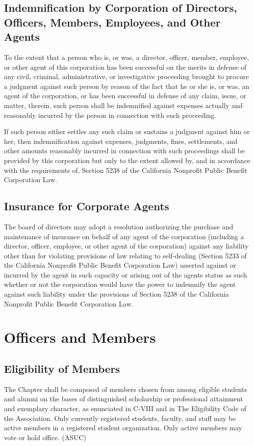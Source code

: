 \documentclass{article}
\begin{document}
	\subsection{Indemnification by Corporation of Directors, Officers, Members, Employees, and Other Agents}
	To the extent that a person who is, or was, a director, officer, member, employee, or other agent of this corporation has been successful on the merits in defense of any civil, criminal, administrative, or investigative proceeding brought to procure a judgment against such person by reason of the fact that he or she is, or was, an agent of the corporation, or has been successful in defense of any claim, issue, or matter, therein, such person shall be indemnified against expenses actually and reasonably incurred by the person in connection with such proceeding.
	
	If such person either settles any such claim or sustains a judgment against him or her, then indemnification against expenses, judgments, fines, settlements, and other amounts reasonably incurred in connection with such proceedings shall be provided by this corporation but only to the extent allowed by, and in accordance with the requirements of, Section 5238 of the California Nonprofit Public Benefit Corporation Law.
	
	\subsection{Insurance for Corporate Agents}
	The board of directors may adopt a resolution authorizing the purchase and maintenance of insurance on behalf of any agent of the corporation (including a director, officer, employee, or other agent of the corporation) against any liability other than for violating provisions of law relating to self-dealing (Section 5233 of the California Nonprofit Public Benefit Corporation Law) asserted against or incurred by the agent in such capacity or arising out of the agent\textquotesingle s status as such whether or not the corporation would have the power to indemnify the agent against such liability under the provisions of Section 5238 of the California Nonprofit Public Benefit Corporation Law.
	
	\section{Officers and Members}
	\subsection{Eligibility of Members}
	The Chapter shall be composed of members chosen from among eligible students and alumni on the bases of distinguished scholarship or professional attainment and exemplary character, as enunciated in C-VIII and in The Eligibility Code of the Association. Only currently registered students, faculty, and staff may be active members in a registered student organization. Only active members may vote or hold office. (ASUC)
\end{document}
